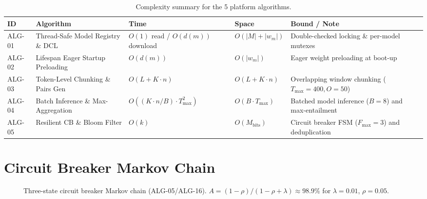 \documentclass[11pt,a4paper]{article}
\theoremstyle{plain}
\theoremstyle{definition}
\theoremstyle{remark}
\begin{document}
\begin{table}[H]
\centering
\caption{Complexity summary for the 5 platform algorithms.}
\label{tab:complexity}
\small
\begin{tabularx}{\textwidth}{@{}lXllX@{}}
\toprule
\textbf{ID} & \textbf{Algorithm} & \textbf{Time} & \textbf{Space}
  & \textbf{Bound / Note} \\
\midrule
ALG-01 & Thread-Safe Model Registry \& DCL & $O(1)$ read / $O(d(m))$ download & $O(|M| + |w_m|)$ & Double-checked locking \& per-model mutexes \\
ALG-02 & Lifespan Eager Startup Preloading & $O(d(m))$ & $O(|w_m|)$ & Eager weight preloading at boot-up \\
ALG-03 & Token-Level Chunking \& Pairs Gen & $O(L + K \cdot n)$ & $O(L + K \cdot n)$ & Overlapping window chunking ($T_{\max}=400, O=50$) \\
ALG-04 & Batch Inference \& Max-Aggregation & $O((K \cdot n / B) \cdot T_{\max}^2)$ & $O(B \cdot T_{\max})$ & Batched model inference ($B=8$) and max-entailment \\
ALG-05 & Resilient CB \& Bloom Filter & $O(k)$ & $O(M_{\text{bits}})$ & Circuit breaker FSM ($F_{\max}=3$) and deduplication \\
\bottomrule
\end{tabularx}
\end{table}

\section{Circuit Breaker Markov Chain}\label{sec:markov}

\begin{figure}[H]
\centering
{}
\caption{Three-state circuit breaker Markov chain (ALG-05/ALG-16).
$A=(1{-}\rho)/(1{-}\rho+\lambda)\approx98.9\%$
for $\lambda=0.01$, $\rho=0.05$.}
\label{fig:markov}
\end{figure}
\end{document}
